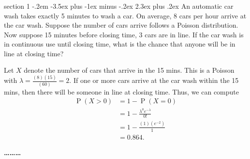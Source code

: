 \documentclass[answers,11pt]{exam}
\makeatletter
\DeclareMathOperator*{\Prob}{P}
\renewcommand{\Pr}{\Prob}
\newenvironment{problem}{\@startsection
       {section}
       {1}
       {-.2em}
       {-3.5ex plus -1ex minus -.2ex}
       {2.3ex plus .2ex}
       {\pagebreak[3]%
       \large\bf\noindent{Problem }
       }
       }
       {%
       \begin{center}\large\bf \ldots\ldots\ldots\end{center}}
\makeatother
\begin{document}
\begin{problem}{}
An automatic car wash takes exactly 5 minutes to wash a car. On average, 8 cars per hour arrive at the car wash.
Suppose the number of cars arrive follows a Poisson distribution. Now suppose 15 minutes before closing time, 3 cars are in line.
If the car wash is in continuous use until closing time, what is the chance that anyone will be in line at closing time?
\begin{solution}
Let $X$ denote the number of cars that arrive in the 15 mins. This is a Poisson with $\lambda=\frac{(8)(15)}{(60)}=2$.
If one or more cars arrive at the car wash within the 15 mins, then there will be someone in line at closing time. Thus,
we can compute
\begin{align*}
\Pr(X > 0) & = 1 - \Pr(X=0) \\
                 &= 1- \frac{\lambda^0 e^{-\lambda}}{0!} \\
                 &= 1- \frac{(1)( e^{-2})}{1} \\
                 &= 0.864.
\end{align*}
\end{solution}
\end{problem}
\end{document}
